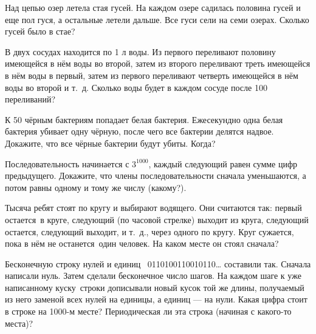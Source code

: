 \documentclass[a4paper,12pt]{article}
\begin{document}

Над цепью озер летела стая %
гусей.
На каждом озере садилась половина гусей и еще
пол гуся, а остальные летели дальше. Все гуси сели на
семи озерах. Сколько гусей было в стае?

В двух сосудах находится по 1 л воды.
Из первого переливают половину имеющейся в н\"ем воды во второй,
затем из второго переливают треть имеющейся в н\"ем воды в
первый, затем из первого переливают четверть имеющейся в н\"ем воды во второй и т.~д.
Сколько воды будет в каждом сосуде после 100 переливаний?


К 50 чёрным бактериям попадает белая бактерия.
Ежесекундно одна белая бактерия убивает одну чёрную, %
после чего все бактерии делятся надвое. Докажите, что %
все чёрные бактерии будут убиты. %
Когда?

Последовательность начинается с $3^{1000}$,
каждый следующий равен сумме цифр предыдущего.
Докажите, что члены последовательности сначала
уменьшаются, %
а потом равны одному и тому же числу (какому?). %

Тысяча ребят стоят по кругу и выбирают водящего.
Они считаются так: первый остается~в круге, следующий
(по часовой стрелке) выходит из круга, следующий %
остается, следующий выходит, и т.~д., через одного по кругу.
Круг сужается, пока в нём не останется~один человек.
На каком месте он стоял сначала?


Бесконечную строку нулей и единиц ~\hbox{0110100110010110\dots}
составили так. Сначала написали нуль.
Затем сделали бесконечное число шагов.
На каждом шаге к уже написанному куску~строки %
дописывали новый кусок той же длины, получаемый из него
заменой всех нулей на единицы, а единиц --- на нули.
 Какая цифра стоит в строке на 1000-м месте?
 Периодическая ли  эта строка (начиная с какого-то места)?
\end{document}
